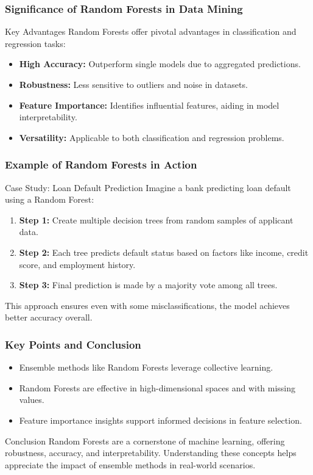 \documentclass[aspectratio=169]{beamer}
\begin{document}
\begin{frame}[fragile]
    \frametitle{Significance of Random Forests in Data Mining}
    \begin{block}{Key Advantages}
        Random Forests offer pivotal advantages in classification and regression tasks:
    \end{block}
    \begin{itemize}
        \item \textbf{High Accuracy:} Outperform single models due to aggregated predictions.
        \item \textbf{Robustness:} Less sensitive to outliers and noise in datasets.
        \item \textbf{Feature Importance:} Identifies influential features, aiding in model interpretability.
        \item \textbf{Versatility:} Applicable to both classification and regression problems.
    \end{itemize}
\end{frame}

\begin{frame}[fragile]
    \frametitle{Example of Random Forests in Action}
    \begin{block}{Case Study: Loan Default Prediction}
        Imagine a bank predicting loan default using a Random Forest:
    \end{block}
    \begin{enumerate}
        \item \textbf{Step 1:} Create multiple decision trees from random samples of applicant data.
        \item \textbf{Step 2:} Each tree predicts default status based on factors like income, credit score, and employment history.
        \item \textbf{Step 3:} Final prediction is made by a majority vote among all trees.
    \end{enumerate}
    This approach ensures even with some misclassifications, the model achieves better accuracy overall.
\end{frame}

\begin{frame}[fragile]
    \frametitle{Key Points and Conclusion}
    \begin{itemize}
        \item Ensemble methods like Random Forests leverage collective learning.
        \item Random Forests are effective in high-dimensional spaces and with missing values.
        \item Feature importance insights support informed decisions in feature selection.
    \end{itemize}
    
    \begin{block}{Conclusion}
        Random Forests are a cornerstone of machine learning, offering robustness, accuracy, and interpretability. Understanding these concepts helps appreciate the impact of ensemble methods in real-world scenarios.
    \end{block}
\end{frame}
\end{document}
